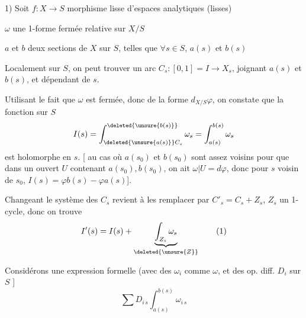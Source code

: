 1) Soit $f:X\longrightarrow S$ morphisme lisse d'espaces analytiques (lisses)

$\omega$ une 1-forme fermée  relative sur $X/S$

$a$ et $b$ deux sections  de $X$ sur $S$, telles que $\forall s\in S$, $a(s)$ et $b(s)$ 

Localement sur $S$, on peut trouver un arc   $C_s:[0,1]=I\longrightarrow X_s$, joignant $a(s)$ et $b(s)$, et dépendant  de $s$.

Utilisant le fait que $\omega$ est fermée, donc  de la forme $d_{X/S}\varphi$, on constate que la fonction sur $S$
\[
 I(s)=\int_{\deleted{\unsure{a(s)}}C_s}^{\deleted{\unsure{b(s)}}}\omega_s
       =\int_{a(s)}^{b(s)}\omega_s
\]
est holomorphe en $s$. [   au cas où  $a(s_0)$ et $b(s_0)$ sont assez voisins pour que dans un ouvert $U$ contenant $a(s_0),b(s_0)$, on ait $\omega|U=d\varphi$, donc pour $s$ voisin de $s_0$, $I(s)=\varphi b(s)-\varphi a(s)$].

Changeant le système des $C_s$ revient à les remplacer par $C'_s=C_s+Z_s$, $Z_s$ un 1-cycle, donc on trouve
\[
 I'(s)=I(s)+\underbrace{\int_{Z_s}\omega_s}_{\deleted{\unsure{Z}}}
 \tag*{(1)}
\]

Considérons une expression formelle (avec des $\omega_i$ comme $\omega$, et des op. diff.  $D_i$ sur $S$ ]
\[
 \sum D_{i\,s}\int_{a(s)}^{b(s)}\omega_{i\,s}
 \tag*{(2)}
\]
